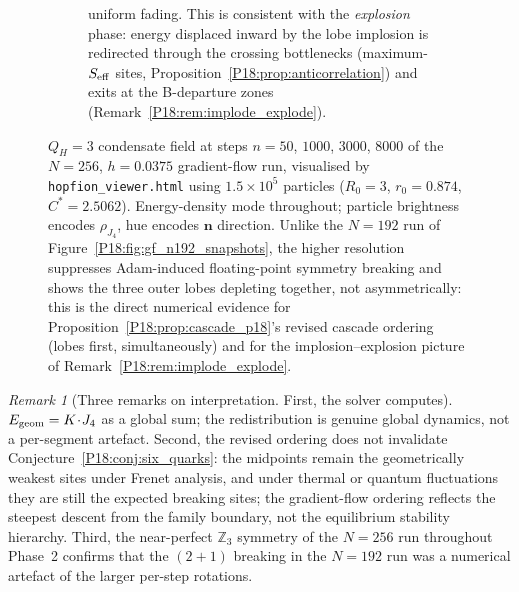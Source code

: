 \documentclass[11pt,a4paper]{article}
\theoremstyle{definition}\newtheorem{definition}[theorem]{Definition}
\theoremstyle{remark}
\newtheorem{remark}[theorem]{Remark}
\newcommand{\QH}{Q_H}
\newcommand{\Zthree}{\mathbb{Z}_3}
\begin{document}
\begin{figure}[htp]
\begin{subfigure}[T]{0.23\linewidth}
{        uniform fading.  This is consistent with the \emph{explosion}
        phase: energy displaced inward by the lobe implosion is
        redirected through the crossing bottlenecks
        (maximum-$S_{\rm eff}$ sites,
        Proposition~\ref{P18:prop:anticorrelation}) and exits at the
        B-departure zones
        (Remark~\ref{P18:rem:implode_explode}).}
        \label{P18:fig:gf_n256_8000}
    \end{subfigure}
    \caption{$\QH=3$ condensate field at steps $n=50$, $1000$,
    $3000$, $8000$ of the $N=256$, $h=0.0375$ gradient-flow run,
    visualised by \texttt{hopfion\_viewer.html} using
    $1.5\times10^5$ particles ($R_0=3$, $r_0=0.874$, $C^*=2.5062$).
    Energy-density mode throughout; particle brightness encodes
    $\rho_{J_4}$, hue encodes $\mathbf{n}$ direction.  Unlike the
    $N=192$ run of Figure~\ref{P18:fig:gf_n192_snapshots}, the higher
    resolution suppresses Adam-induced floating-point symmetry
    breaking and shows the three outer lobes depleting together,
    not asymmetrically: this is the direct numerical evidence for
    Proposition~\ref{P18:prop:cascade_p18}'s revised cascade ordering
    (lobes first, simultaneously) and for the
    implosion--explosion picture of
    Remark~\ref{P18:rem:implode_explode}.}
    \label{P18:fig:gf_n256_cascade}
\end{figure}

\begin{remark}[Three remarks on interpretation.  First, the solver computes]
\label{P18:rem:three_remark_interpretation}
$E_{\rm geom}=K\!\cdot\!J_4$ as a global sum; the redistribution is
genuine global dynamics, not a per-segment artefact.  Second, the
revised ordering does not invalidate Conjecture~\ref{P18:conj:six_quarks}:
the midpoints remain the geometrically weakest sites under Frenet
analysis, and under thermal or quantum fluctuations they are still the
expected breaking sites; the gradient-flow ordering reflects the steepest
descent from the family boundary, not the equilibrium stability hierarchy.
Third, the near-perfect $\Zthree$ symmetry of the $N=256$ run throughout
Phase~2 confirms that the $(2{+}1)$ breaking in the $N=192$ run was a
numerical artefact of the larger per-step rotations.
\end{remark}
\end{document}
